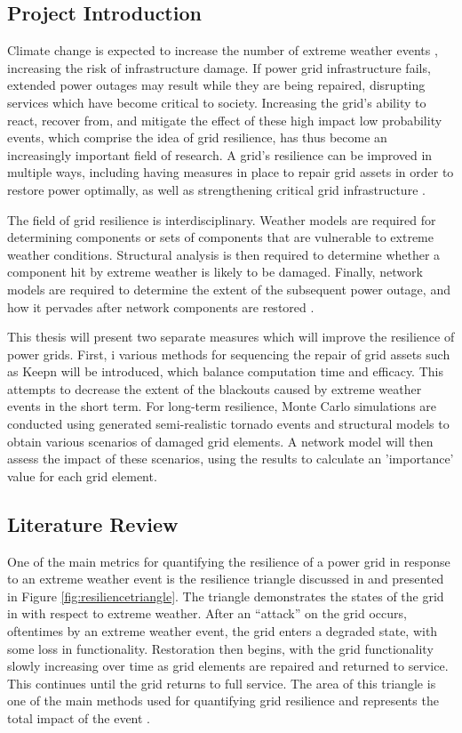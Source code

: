 \documentclass[12pt]{article}
\begin{document}
\subsection{Project Introduction}
Climate change is expected to increase the number of extreme weather events \cite{cheng}, increasing the risk of infrastructure damage. If power grid infrastructure fails, extended power outages may result while they are being repaired, disrupting services which have become critical to society. Increasing the grid’s ability to react, recover from, and mitigate the effect of these high impact low probability events, which comprise the idea of grid resilience, has thus become an increasingly important field of research. A grid’s resilience can be improved in multiple ways, including having measures in place to repair grid assets in order to restore power optimally, as well as strengthening critical grid infrastructure \cite{panteli}. \par
The field of grid resilience is interdisciplinary. Weather models are required for determining components or sets of components that are vulnerable to extreme weather conditions. Structural analysis is then required to determine whether a component hit by extreme weather is likely to be damaged. Finally, network models are required to determine the extent of the subsequent power outage, and how it pervades after network components are restored \cite{panteli}. \par
This thesis will present two separate measures which will improve the resilience of power grids. First, i various methods for sequencing the repair of grid assets such as Keepn will be introduced, which balance computation time and efficacy. This attempts to decrease the extent of the blackouts caused by extreme weather events in the short term. For long-term resilience, Monte Carlo simulations are conducted using generated semi-realistic tornado events and structural models to obtain various scenarios of damaged grid elements. A network model will then assess the impact of these scenarios, using the results to calculate an 'importance' value for each grid element.
\subsection{Literature Review} \label{LitReview}
One of the main metrics for quantifying the resilience of a power grid in response to an extreme weather event is the resilience triangle discussed in \cite{Jufri} and presented in Figure \ref{fig:resiliencetriangle}. The triangle demonstrates the states of the grid in with respect to extreme weather. After an “attack” on the grid occurs, oftentimes by an extreme weather event, the grid enters a degraded state, with some loss in functionality.  Restoration then begins, with the grid functionality slowly increasing over time as grid elements are repaired and returned to service. This continues until the grid returns to full service. The area of this triangle is one of the main methods used for quantifying grid resilience and represents the total impact of the event \cite{Jufri}.  \par
\end{document}
